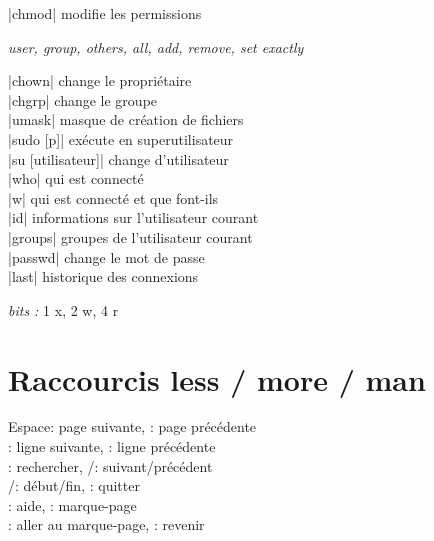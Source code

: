 \documentclass[9pt]{extarticle}
\newcommand{\lstcode}[1]{\inlinecode{\detokenize{#1}}}
\let\oldkeys\keys
\renewcommand{\keys}[1]{\small\oldkeys{#1}\normalsize}
\newenvironment{cmdblock}{%
  \par\setlength{\parindent}{0pt}\setlength{\parskip}{0pt}%
  \RaggedRight%
}{\par}
\newlength{\cmdoptindent}
\newcommand{\cmdopt}[1]{%
  \hspace*{\cmdoptindent}%
  \begin{minipage}[t]{\dimexpr\linewidth-\cmdoptindent\relax}
    \RaggedRight \itshape #1%
  \end{minipage}\par
}
\begin{document}
\begin{multicols}{4}
\begin{cmdblock}
\code|chmod| \quad modifie les permissions \\
\cmdopt{\lstcode{u} user, \lstcode{g} group, \lstcode{o} others, \lstcode{a} all,
        \lstcode{+} add, \lstcode{-} remove, \lstcode{=} set exactly}
\code|chown| \quad change le propriétaire \\
\code|chgrp| \quad change le groupe \\
\code|umask| \quad masque de création de fichiers \\
\code|sudo [p]| \quad exécute en superutilisateur \\
\code|su [utilisateur]| \quad change d'utilisateur \\
\code|who| \quad qui est connecté \\
\code|w| \quad qui est connecté et que font-ils \\
\code|id| \quad informations sur l'utilisateur courant \\
\code|groups| \quad groupes de l'utilisateur courant \\
\code|passwd| \quad change le mot de passe \\
\code|last| \quad historique des connexions \\
\end{cmdblock}

\textit{bits :} 1 x, 2 w, 4 r \\

\section*{Raccourcis less / more / man}
Espace: page suivante, : page précédente \\
\keys{\return}{}: ligne suivante, : ligne précédente \\
\keys{/}: rechercher, /: suivant/précédent \\
/: début/fin, : quitter \\
: aide, : marque-page \\
: aller au marque-page, : revenir \\



\end{multicols}
\end{document}
